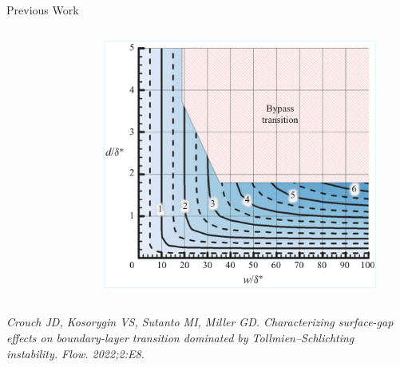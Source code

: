 \documentclass[aspectratio=43, xcolor=table]{beamer}
\begin{document}
\begin{frame}{Previous Work}

	\begin{columns}[T] %
		\begin{column}{0.495\linewidth} %
			\vspace{1.5cm}
			\begin{figure}
				\fboxsep=0pt %
			\end{figure}
		\end{column}
		\begin{column}{0.495\linewidth} %
			\begin{figure}
				\vspace{0.15cm}
				\includegraphics[width=\textwidth]{Images/jeffHeatMap.pdf}
			\end{figure}
		\end{column}
	\end{columns}
	\vspace{0.2cm}

	{\fontsize{6}{8}\selectfont
		\textit{Crouch JD, Kosorygin VS, Sutanto MI, Miller GD. Characterizing surface-gap effects on boundary-layer transition dominated by Tollmien–Schlichting instability. Flow. 2022;2:E8.}}
\end{frame}
\end{document}
